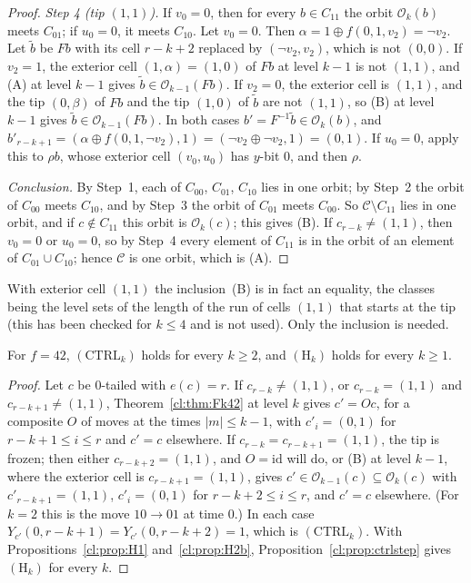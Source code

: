 \begin{proof}
\emph{Step 4 (tip $(1,1)$).} If $v_0=0$, then for every $b\in C_{11}$ the orbit $\mathcal O_k(b)$ meets $C_{01}$; if $u_0=0$, it meets $C_{10}$. Let $v_0=0$. Then $\alpha=1\oplus f(0,1,v_2)=\neg v_2$. Let $\tilde b$ be $Fb$ with its cell $r-k+2$ replaced by $(\neg v_2,v_2)$, which is not $(0,0)$. If $v_2=1$, the exterior cell $(1,\alpha)=(1,0)$ of $Fb$ at level $k-1$ is not $(1,1)$, and (A) at level $k-1$ gives $\tilde b\in\mathcal O_{k-1}(Fb)$. If $v_2=0$, the exterior cell is $(1,1)$, and the tip $(0,\beta)$ of $Fb$ and the tip $(1,0)$ of $\tilde b$ are not $(1,1)$, so (B) at level $k-1$ gives $\tilde b\in\mathcal O_{k-1}(Fb)$. In both cases $b'=F^{-1}\tilde b\in\mathcal O_k(b)$, and $b'_{r-k+1}=(\alpha\oplus f(0,1,\neg v_2),1)=(\neg v_2\oplus\neg v_2,1)=(0,1)$. If $u_0=0$, apply this to $\rho b$, whose exterior cell $(v_0,u_0)$ has $y$-bit $0$, and then $\rho$.

\emph{Conclusion.} By Step~1, each of $C_{00}$, $C_{01}$, $C_{10}$ lies in one orbit; by Step~2 the orbit of $C_{00}$ meets $C_{10}$, and by Step~3 the orbit of $C_{01}$ meets $C_{00}$. So $\mathcal C\setminus C_{11}$ lies in one orbit, and if $c\notin C_{11}$ this orbit is $\mathcal O_k(c)$; this gives (B). If $c_{r-k}\ne(1,1)$, then $v_0=0$ or $u_0=0$, so by Step~4 every element of $C_{11}$ is in the orbit of an element of $C_{01}\cup C_{10}$; hence $\mathcal C$ is one orbit, which is (A).
\end{proof}

With exterior cell $(1,1)$ the inclusion~(B) is in fact an equality, the classes being the level sets of the length of the run of cells $(1,1)$ that starts at the tip (this has been checked for $k\le4$ and is not used). Only the inclusion is needed.

\begin{corollary}\label{cl:cor:ctrl42}
For $f=42$, $(\mathrm{CTRL}_k)$ holds for every $k\ge2$, and $(\mathrm H_k)$ holds for every $k\ge1$.
\end{corollary}

\begin{proof}
Let $c$ be $0$-tailed with $e(c)=r$. If $c_{r-k}\ne(1,1)$, or $c_{r-k}=(1,1)$ and $c_{r-k+1}\ne(1,1)$, Theorem~\ref{cl:thm:Fk42} at level $k$ gives $c'=Oc$, for a composite $O$ of moves at the times $|m|\le k-1$, with $c'_i=(0,1)$ for $r-k+1\le i\le r$ and $c'=c$ elsewhere. If $c_{r-k}=c_{r-k+1}=(1,1)$, the tip is frozen; then either $c_{r-k+2}=(1,1)$, and $O=\mathrm{id}$ will do, or (B) at level $k-1$, where the exterior cell is $c_{r-k+1}=(1,1)$, gives $c'\in\mathcal O_{k-1}(c)\subseteq\mathcal O_k(c)$ with $c'_{r-k+1}=(1,1)$, $c'_i=(0,1)$ for $r-k+2\le i\le r$, and $c'=c$ elsewhere. (For $k=2$ this is the move $10\to01$ at time $0$.) In each case $Y_{c'}(0,r-k+1)=Y_{c'}(0,r-k+2)=1$, which is $(\mathrm{CTRL}_k)$. With Propositions~\ref{cl:prop:H1} and~\ref{cl:prop:H2b}, Proposition~\ref{cl:prop:ctrlstep} gives $(\mathrm H_k)$ for every $k$.
\end{proof}

